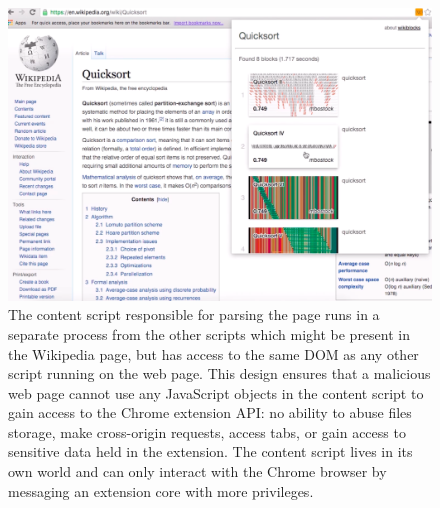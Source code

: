 \documentclass[a4paper, 11pt]{article} %
\begin{document}
\begin{figure}
	\centering
	\includegraphics[width=\textwidth]{wikiblocks-quicksort}
	\caption{The content script responsible for parsing the page runs in a separate process from the other scripts which might be present in the Wikipedia page, but has access to the same DOM as any other script running on the web page. This design ensures that a malicious web page cannot use any JavaScript objects in the content script to gain access to the Chrome extension API: no ability to abuse files storage, make cross-origin requests, access tabs, or gain access to sensitive data held in the extension. The content script lives in its own world and can only interact with the Chrome browser by messaging an extension core with more privileges.}
	\label{fig:wikiblocks-quicksort}
\end{figure}
\end{document}
